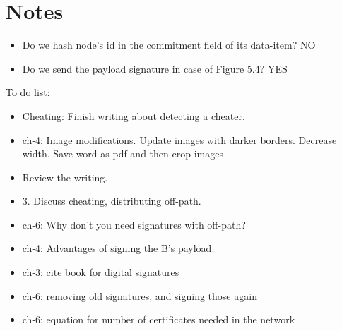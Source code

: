 \chapter{Notes}

\begin{itemize}
	\item Do we hash node's id in the commitment field of its data-item? NO
	\item Do we send the payload signature in case of Figure 5.4? YES
\end{itemize}

To do list:
\begin{itemize}
	\item Cheating: Finish writing about detecting a cheater.
	\item ch-4: Image modifications. Update images with darker borders. Decrease width. Save word as pdf and then crop images
	\item Review the writing.

	\item 3. Discuss cheating, distributing off-path.  
	\item ch-6: Why don't you need signatures with off-path?
	\item ch-4: Advantages of signing the B's payload.

	\item ch-3: cite book for digital signatures

	\item ch-6: removing old signatures, and signing those again
	\item ch-6: equation for number of certificates needed in the network

\end{itemize}